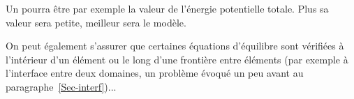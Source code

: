 \medskip
Un  pourra être par exemple la valeur de l'énergie potentielle totale. Plus sa valeur sera petite, meilleur sera le modèle.

\medskip
On peut également s'assurer que certaines équations d'équilibre sont vérifiées à l'intérieur d'un élément ou le long d'une frontière entre éléments (par exemple à l'interface entre deux domaines, un problème évoqué un peu avant au paragraphe~\ref{Sec-interf})...


